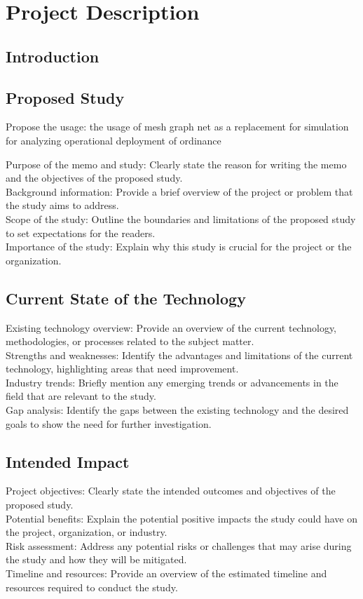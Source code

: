 \section{Project Description}
\subsection{Introduction}
\subsection{Proposed Study}
Propose the usage:
the usage of mesh graph net as a replacement for simulation for analyzing operational deployment of ordinance

Purpose of the memo and study: Clearly state the reason for writing the memo and the objectives of the proposed study.\\
Background information: Provide a brief overview of the project or problem that the study aims to address.\\
Scope of the study: Outline the boundaries and limitations of the proposed study to set expectations for the readers.\\
Importance of the study: Explain why this study is crucial for the project or the organization.\\

\subsection{Current State of the Technology}
Existing technology overview: Provide an overview of the current technology, methodologies, or processes related to the subject matter.\\
Strengths and weaknesses: Identify the advantages and limitations of the current technology, highlighting areas that need improvement.\\
Industry trends: Briefly mention any emerging trends or advancements in the field that are relevant to the study.\\
Gap analysis: Identify the gaps between the existing technology and the desired goals to show the need for further investigation.\\

\subsection{Intended Impact}
Project objectives: Clearly state the intended outcomes and objectives of the proposed study.\\
Potential benefits: Explain the potential positive impacts the study could have on the project, organization, or industry.\\
Risk assessment: Address any potential risks or challenges that may arise during the study and how they will be mitigated.\\
Timeline and resources: Provide an overview of the estimated timeline and resources required to conduct the study.\\